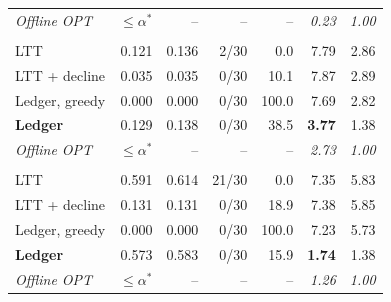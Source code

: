 \begin{table}[t]
\begin{tabular}{lrrrrrr}
\quad \textit{Offline OPT} & $\le\alpha^{*}$ & -- & -- & -- & \textit{0.23} & \textit{1.00} \\
\addlinespace[3pt]
\multicolumn{7}{l}{\textit{ASQA} ($\alpha^{*}=0.15$, $\min_p r_p=0.120$, $N=798$)} \\
\quad LTT & 0.121 & 0.136 & 2/30 & 0.0 & 7.79 & 2.86 \\
\quad LTT + decline & 0.035 & 0.035 & 0/30 & 10.1 & 7.87 & 2.89 \\
\quad Ledger, greedy & 0.000 & 0.000 & 0/30 & 100.0 & 7.69 & 2.82 \\
\quad \textbf{Ledger} & 0.129 & 0.138 & 0/30 & 38.5 & \textbf{3.77} & 1.38 \\
\quad \textit{Offline OPT} & $\le\alpha^{*}$ & -- & -- & -- & \textit{2.73} & \textit{1.00} \\
\addlinespace[3pt]
\multicolumn{7}{l}{\textit{QAMPARI} ($\alpha^{*}=0.60$, $\min_p r_p=0.591$, $N=850$)} \\
\quad LTT & 0.591 & 0.614 & 21/30 & 0.0 & 7.35 & 5.83 \\
\quad LTT + decline & 0.131 & 0.131 & 0/30 & 18.9 & 7.38 & 5.85 \\
\quad Ledger, greedy & 0.000 & 0.000 & 0/30 & 100.0 & 7.23 & 5.73 \\
\quad \textbf{Ledger} & 0.573 & 0.583 & 0/30 & 15.9 & \textbf{1.74} & 1.38 \\
\quad \textit{Offline OPT} & $\le\alpha^{*}$ & -- & -- & -- & \textit{1.26} & \textit{1.00} \\
\bottomrule
\end{tabular}
\end{table}
